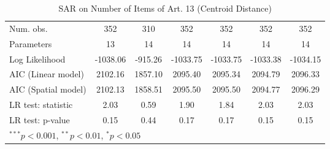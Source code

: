 \begin{table}[!h]
\begin{center}
\begin{tabular}{l c c c c c c }
\midrule
Num. obs.               & 352         & 310         & 352         & 352         & 352         & 352         \\
Parameters              & 13          & 14          & 14          & 14          & 14          & 14          \\
Log Likelihood          & -1038.06    & -915.26     & -1033.75    & -1033.75    & -1033.38    & -1034.15    \\
AIC (Linear model)      & 2102.16     & 1857.10     & 2095.40     & 2095.34     & 2094.79     & 2096.33     \\
AIC (Spatial model)     & 2102.13     & 1858.51     & 2095.50     & 2095.50     & 2094.77     & 2096.29     \\
LR test: statistic      & 2.03        & 0.59        & 1.90        & 1.84        & 2.03        & 2.03        \\
LR test: p-value        & 0.15        & 0.44        & 0.17        & 0.17        & 0.15        & 0.15        \\
\bottomrule
\multicolumn{7}{l}{\scriptsize{$^{***}p<0.001$, $^{**}p<0.01$, $^*p<0.05$}}
\end{tabular}
\caption{SAR on Number of Items of Art. 13 (Centroid Distance)}
\label{table:coefficients}
\end{center}
\end{table}

